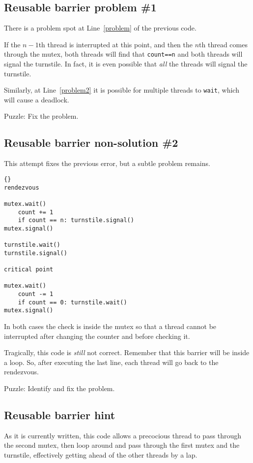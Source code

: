 \documentclass{book}
\newcommand{\clearemptydoublepage}{\newpage\cleardoublepage}
\begin{document}
\subsection {Reusable barrier problem \#1}

There is a problem spot at Line~\ref{problem} of the previous code.

If the $n-1$th thread is interrupted at this point,
and then the $n$th thread comes through the mutex,
both threads will find that {\tt count==n} and both
threads will signal the turnstile.  In fact, it is even
possible that {\em all} the threads will signal the turnstile.

Similarly, at Line~\ref{problem2} it is possible for multiple
threads to {\tt wait}, which will cause a deadlock.

Puzzle: Fix the problem.

\clearemptydoublepage
\subsection {Reusable barrier non-solution \#2}

This attempt fixes the previous error, but a subtle problem
remains.

\begin{lstlisting}[title={Reusable barrier non-solution}]{}
rendezvous

mutex.wait()
    count += 1
    if count == n: turnstile.signal()
mutex.signal()

turnstile.wait()
turnstile.signal()

critical point

mutex.wait()
    count -= 1
    if count == 0: turnstile.wait()
mutex.signal()
\end{lstlisting}

In both cases the check is inside the mutex so that
a thread cannot be interrupted after changing the counter
and before checking it.

Tragically, this code is {\em still} not correct.
Remember that this barrier will be inside a loop.  So, after
executing the last line, each thread will go back
to the rendezvous.

Puzzle: Identify and fix the problem.


\clearemptydoublepage
\subsection {Reusable barrier hint}

As it is currently written, this code
allows a precocious thread to pass through the second mutex,
then loop around and pass through the first mutex and the
turnstile, effectively getting ahead of the other threads by
a lap.
\end{document}
